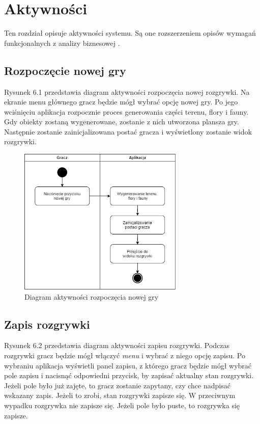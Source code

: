 \chapter{Aktywności}

Ten rozdział opisuje aktywności systemu. Są one rozszerzeniem opisów wymagań funkcjonalnych z analizy biznesowej \cite{dokumentacja}.

\section{Rozpoczęcie nowej gry}

Rysunek 6.1 przedstawia diagram aktywności rozpoczęcia nowej rozgrywki.
Na ekranie menu głównego gracz będzie mógł wybrać opcję nowej gry. Po jego wciś\-nię\-ciu aplikacja rozpocznie proces generowania części terenu, flory i fauny. Gdy obiekty zostaną wygenerowane, zostanie z nich utworzona plansza gry. Następnie zostanie zainicjalizowana postać gracza i wyświetlony zostanie widok rozgrywki.

\begin{figure}[H]
    \centering
        \includegraphics[width=0.7\textwidth]{Graphics/activities/new_game.png}
         \caption{Diagram aktywności rozpoczęcia nowej gry}
\end{figure}

\clearpage

\section{Zapis rozgrywki}

Rysunek 6.2 przedstawia diagram aktywności zapisu rozgrywki.
Podczas rozgrywki gracz będzie mógł włączyć \textit{menu} i wybrać z niego opcję zapisu. Po wybraniu aplikacja wyświetli panel zapisu, z którego gracz będzie mógł wybrać pole zapisu i nacisnąć odpowiedni przycisk, by zapisać aktualny stan rozgrywki. Jeżeli pole było już zajęte, to gracz zostanie zapytany, czy chce nadpisać wskazany zapis. Jeżeli to zrobi, stan rozgrywki zapisze się. W przeciwnym wypadku rozgrywka nie zapisze się. Jeżeli pole było puste, to rozgrywka się zapisze.

